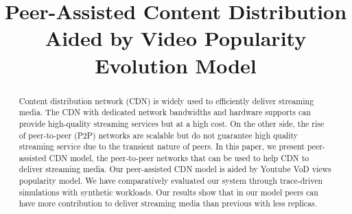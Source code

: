 \documentclass[10pt,final,journal,a4paper]{IEEEtran}
\begin{document}
%
\title{Peer-Assisted Content Distribution Aided by Video Popularity Evolution Model}

\author{
 \quad
{}
}








\maketitle


\begin{abstract}
Content distribution network (CDN) is widely used to efficiently deliver streaming media. 
The CDN with dedicated network bandwidths and hardware supports can provide high-quality streaming services but at a high cost. 
On the other side, the rise of peer-to-peer (P2P) networks are scalable but do not guarantee high quality streaming service due to the transient nature of peers.
In this paper, we present peer-assisted CDN model, the peer-to-peer networks that can be used to help CDN to deliver streaming media.
Our peer-assisted CDN model is aided by Youtube VoD views popularity model.
We have comparatively evaluated our system through trace-driven simulations with synthetic workloads.
Our results show that in our model peers can have more contribution to deliver streaming media than previous with less replicas.
\end{abstract}
\end{document}
